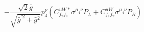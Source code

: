 %
\begin{dmath*}
%
  -  \frac{\sqrt{2} {\bar g}{}}{\sqrt{{\bar g}^{\prime 2} + {\bar g}{}^2}} p_4^{\nu} \left(C^{uW*}_{f_2 f_1} \sigma^{\mu_4 \nu } P_L  + C^{uW}_{f_1 f_2} \sigma^{\mu_4 \nu } P_R \right)
%
\end{dmath*}
%
